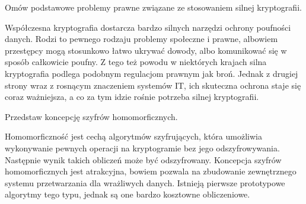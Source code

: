\documentclass[answers,11pt]{exam}
\begin{document}
\begin{questions}
\question Omów podstawowe problemy prawne związane ze stosowaniem silnej kryptografii.
\begin{solution}
Współczesna kryptografia dostarcza bardzo silnych narzędzi ochrony poufności danych. Rodzi to pewnego rodzaju problemy społeczne i prawne, albowiem przestępcy mogą stosunkowo łatwo ukrywać dowody, albo komunikować się w sposób całkowicie poufny. Z tego też powodu w niektórych krajach silna kryptografia podlega podobnym regulacjom prawnym jak broń. Jednak z drugiej strony wraz z rosnącym znaczeniem systemów IT, ich skuteczna ochrona staje się coraz ważniejsza, a co za tym idzie rośnie potrzeba silnej kryptografii.
\end{solution}

\question Przedstaw koncepcję szyfrów homomorficznych.
\begin{solution}
Homomorficzność jest cechą algorytmów szyfrujących, która umożliwia wykonywanie pewnych operacji na kryptogramie bez jego odszyfrowywania. Następnie wynik takich obliczeń może być  odszyfrowany. Koncepcja szyfrów homomorficznych jest atrakcyjna, bowiem pozwala na zbudowanie zewnętrznego systemu przetwarzania dla wrażliwych danych. Istnieją pierwsze prototypowe algorytmy tego typu, jednak są one bardzo kosztowne obliczeniowe.
\end{solution}

\end{questions}
\end{document}
